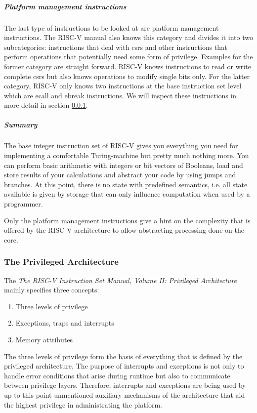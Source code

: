 \subparagraph{Platform management instructions}
The last type of instructions to be looked at are platform management instructions.
The RISC-V manual also knows this category and divides it into two subcategories: instructions that deal with \glspl{csr} and other instructions that perform operations that potentially need some form of privilege.
Examples for the former category are straight forward.
RISC-V knows instructions to read or write complete \glspl{csr} but also knows operations to modify single bits only.
For the latter category, RISC-V only knows two instructions at the base instruction set level which are \gls{ecall} and \gls{ebreak} instructions.
We will inspect these instructions in more detail in section \ref{sec:rv-priv-arch}.

\subparagraph{Summary}
The base integer instruction set of RISC-V gives you everything you need for implementing a comfortable Turing-machine but pretty much nothing more.
You can perform basic arithmetic with integers or bit vectors of Booleans, load and store results of your calculations and abstract your code by using jumps and branches.
At this point, there is no state with predefined semantics, i.e. all state available is given by storage that can only influence computation when used by a programmer.

Only the platform management instructions give a hint on the complexity that is offered by the RISC-V architecture to allow abstracting processing done on the core.

\subsubsection{The Privileged Architecture}
\label{sec:rv-priv-arch}

The \textit{The RISC-V Instruction Set Manual, Volume II: Privileged Architecture} \cite{RiscVISAP} mainly specifies three concepts:
\begin{enumerate}
    \item Three levels of privilege
    \item Exceptions, traps and interrupts
    \item Memory attributes
\end{enumerate}

The three levels of privilege form the basis of everything that is defined by the privileged architecture.
The purpose of interrupts and exceptions is not only to handle error conditions that arise during runtime but also to communicate between privilege layers.
Therefore, interrupts and exceptions are being used by up to this point unmentioned auxiliary mechanisms of the architecture that aid the highest privilege in administrating the platform.

